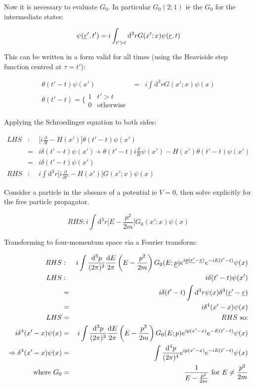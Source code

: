 Now it is necessary to evaluate $G_0$.  In particular $G_0(2;1)$ ie the $G_0$ for the intermediate states:

\[
  \psi(\underline{r}',t') = i\int_{t'>t} \mathrm{d}^3r G(x';x)\psi(\underline{r},t)
\]

This can be written in a form valid for all times (using the Heaviside step function centred at $\tau = t'$):

\begin{eqnarray*}
  \theta(t'-t)\psi(x') & = & i\int \mathrm{d}^3r G(x';x)\psi(x) \\
  \theta(t'-t) = \Bigg\{
    \begin{array}{cc}
    1 & t'>t \\
    0 & \textrm{otherwise}
    \end{array}
\end{eqnarray*}

Applying the Schroedinger equation to both sides:

\begin{eqnarray*}
  LHS & : & \Bigg[ i\frac{\partial}{\partial t} - H(x')\Bigg] \theta(t'-t)\psi(x') \\
  & = & i\delta(t'-t)\psi(x') + \theta(t'-t)i\frac{\delta}{\delta t}\psi(x') -H(x')\theta(t'-t)\psi(x') \\
  & = & i\delta(t'-t)\psi(x') \\
  RHS & : & i\int\mathrm{d}^3r\Bigg[ i\frac{\partial}{\partial t'} - H(x')\Bigg] G(x';x)\psi(x)
\end{eqnarray*}

Consider a particle in the absence of a potential ie $V = 0$, then solve explicitly for the free particle propagator.

\[
  RHS : i\int\mathrm{d}^3r\Bigg[ E - \frac{p^2}{2m}\Bigg] G_0(x';x)\psi(x)
\]

Transforming to four-momentum space via a Fourier transform:

\begin{eqnarray*}
  RHS & : & i\int\frac{\mathrm{d}^3p}{(2 \pi)^3}\frac{\mathrm{d}E}{2\pi}\left(E - \frac{p^2}{2m}\right)G_0(E;\underline{p}) e^{i\underline{p}(\underline{r'}-\underline{x})}e^{-iE(t'-t)}\psi(x) \\
  LHS & : & i\delta(t'-t)\psi(x') \\
      & = & i\delta(t'-t)\int\mathrm{d}^3r\psi(x)\delta^3(\underline{r}' - \underline{r}) \\
      & = & i\delta^4(x'-x)\psi(x) \\
  LHS & = & RHS \textrm{ so:} \\
  i\delta^4(x'-x)\psi(x) & = & i\int\frac{\mathrm{d}^3p}{(2\pi)^3}\frac{\mathrm{d}E}{2\pi}\left(E - \frac{p^2}{2m}\right)G_0(E;p)e^{ip(x'-x)}e^{-E(t'-t)}\psi(x) \\
  \Rightarrow \delta^4(x'-x)\psi(x) & = & \int\frac{\mathrm{d}^4p}{(2\pi)^4}e^{ip(x'-x)}e^{-iE(t'-t)}\psi(x) \\
  \textrm{where } G_0 & = & \frac{1}{E - \frac{p^2}{2m}} \textrm{ for } E \neq \frac{p^2}{2m}
\end{eqnarray*}

